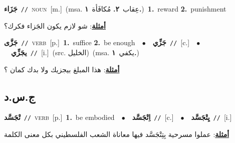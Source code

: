 \documentclass[10pt,a4paper,twoside]{article} %
\begin{document}
\begin{multicols}{2}
{\setlength\topsep{0pt}\textbf{\foreignlanguage{arabic}{جَزَاء}}\ {\color{gray}\texttt{//}\color{black}}\ \textsc{noun}\ [m.]\ \color{gray}(msa. \foreignlanguage{arabic}{عِقاب}~\foreignlanguage{arabic}{\textbf{٢.}}  \foreignlanguage{arabic}{مُكافَأة}~\foreignlanguage{arabic}{\textbf{١.}})\color{black}\ \textbf{1.}~reward  \textbf{2.}~punishment\  \begin{flushright}\color{gray}\foreignlanguage{arabic}{\textbf{\underline{\foreignlanguage{arabic}{أمثلة}}}: شو لازم يكون الجَزاء فكرك؟}\end{flushright}\color{black}} \vspace{2mm}

{\setlength\topsep{0pt}\textbf{\foreignlanguage{arabic}{جَزَّى}}\ {\color{gray}\texttt{//}\color{black}}\ \textsc{verb}\ [p.]\ \textbf{1.}~suffice  \textbf{2.}~be enough\ \ $\bullet$\ \ \setlength\topsep{0pt}\textbf{\foreignlanguage{arabic}{جَزِّي}}\ {\color{gray}\texttt{//}\color{black}}\ [c.]\ \ $\bullet$\ \ \setlength\topsep{0pt}\textbf{\foreignlanguage{arabic}{يجَزِّي}}\ {\color{gray}\texttt{//}\color{black}}\ [i.]\ (src. \color{gray}\foreignlanguage{arabic}{الخليل}\color{black})\ \color{gray}(msa. \foreignlanguage{arabic}{يكفي}~\foreignlanguage{arabic}{\textbf{١.}})\color{black}\  \begin{flushright}\color{gray}\foreignlanguage{arabic}{\textbf{\underline{\foreignlanguage{arabic}{أمثلة}}}: هذا المبلغ بيجزيك ولا بدك كمان ؟}\end{flushright}\color{black}} \vspace{2mm}

\vspace{-3mm}
\subsection*{\color{blue}\foreignlanguage{arabic}{ج.س.د}\color{blue}{}} 

{\setlength\topsep{0pt}\textbf{\foreignlanguage{arabic}{تْجَسَّد}}\ {\color{gray}\texttt{//}\color{black}}\ \textsc{verb}\ [p.]\ \textbf{1.}~be embodied\ \ $\bullet$\ \ \setlength\topsep{0pt}\textbf{\foreignlanguage{arabic}{اِتْجَسَّد}}\ {\color{gray}\texttt{//}\color{black}}\ [c.]\ \ $\bullet$\ \ \setlength\topsep{0pt}\textbf{\foreignlanguage{arabic}{يِتْجَسَّد}}\ {\color{gray}\texttt{//}\color{black}}\ [i.]\  \begin{flushright}\color{gray}\foreignlanguage{arabic}{\textbf{\underline{\foreignlanguage{arabic}{أمثلة}}}: عملوا مسرحية بِتِتْجَسَّد فيها معاناة الشعب الفلسطيني بكل معنى الكلمة}\end{flushright}\color{black}} \vspace{2mm}


\end{multicols}
\end{document}
